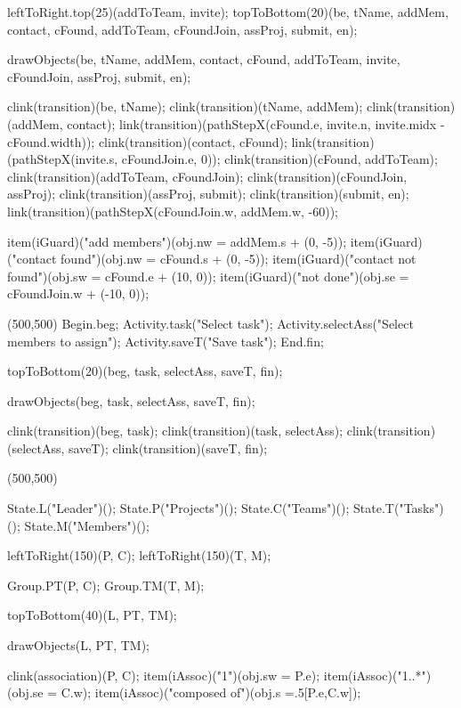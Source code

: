\begin{empfile}
\begin{empdef}[activityR2]
leftToRight.top(25)(addToTeam, invite);
topToBottom(20)(be, tName, addMem, contact, cFound, addToTeam, cFoundJoin, assProj, submit, en);

drawObjects(be, tName, addMem, contact, cFound, addToTeam, invite, cFoundJoin, assProj, submit, en);

clink(transition)(be, tName);
clink(transition)(tName, addMem);
clink(transition)(addMem, contact);
link(transition)(pathStepX(cFound.e, invite.n, invite.midx - cFound.width));
clink(transition)(contact, cFound);
link(transition)(pathStepX(invite.s, cFoundJoin.e, 0));
clink(transition)(cFound, addToTeam);
clink(transition)(addToTeam, cFoundJoin);
clink(transition)(cFoundJoin, assProj);
clink(transition)(assProj, submit); 
clink(transition)(submit, en);
link(transition)(pathStepX(cFoundJoin.w, addMem.w, -60));

item(iGuard)("add members")(obj.nw = addMem.s + (0, -5));
item(iGuard)("contact found")(obj.nw = cFound.s + (0, -5));
item(iGuard)("contact not found")(obj.sw = cFound.e + (10, 0));
item(iGuard)("not done")(obj.se = cFoundJoin.w + (-10, 0));
\end{empdef}

\begin{empdef}[activityR4](500,500)
Begin.beg;
Activity.task("Select task");
Activity.selectAss("Select members to assign");
Activity.saveT("Save task");
End.fin;

topToBottom(20)(beg, task, selectAss, saveT, fin);

drawObjects(beg, task, selectAss, saveT, fin);

clink(transition)(beg, task);
clink(transition)(task, selectAss);
clink(transition)(selectAss, saveT);
clink(transition)(saveT, fin);
\end{empdef}

\begin{empdef}[erdiag](500,500)

State.L("Leader")();
State.P("Projects")();
State.C("Teams")();
State.T("Tasks")();
State.M("Members")();

leftToRight(150)(P, C);
leftToRight(150)(T, M);

Group.PT(P, C);
Group.TM(T, M);

topToBottom(40)(L, PT, TM);



drawObjects(L, PT, TM);

clink(association)(P, C);
item(iAssoc)("1")(obj.sw = P.e);
item(iAssoc)("1..*")(obj.se = C.w);
item(iAssoc)("composed of")(obj.s =.5[P.e,C.w]);


\end{empdef}
\end{empfile}
